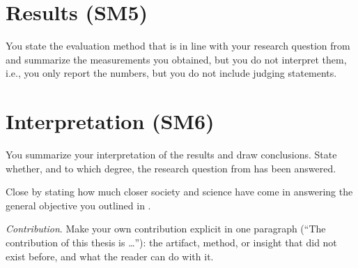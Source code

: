 \documentclass[../thesis-example-en]{subfiles}
\begin{document}
\section*{Results (SM5)}

You state the evaluation method that is in line with your research question from  and summarize the measurements you obtained, but you do not interpret them, i.e., you only report the numbers, but you do not include judging statements.

\section*{Interpretation (SM6)}

You summarize your interpretation of the results and draw conclusions.
State whether, and to which degree, the research question from  has been answered.

Close by stating how much closer society and science have come in answering the general objective you outlined in .

\emph{Contribution}.
Make your own contribution explicit in one paragraph (\enquote{The contribution of this thesis is \ldots}): the artifact, method, or insight that did not exist before, and what the reader can do with it.
\end{document}
